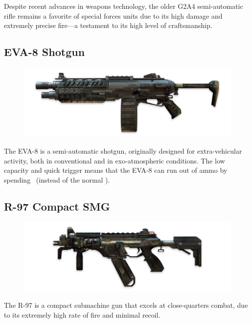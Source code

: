 \documentclass[9pt, openany]{extbook}
\begin{document}
Despite recent advances in weapons technology, the older G2A4 semi-automatic rifle remains a favorite of special forces units due to its high damage and extremely precise fire---a testament to its high level of craftsmanship.

\subsection{EVA-8 Shotgun}
\begin{figure}
\vspace*{-2em}
\includegraphics[width=\linewidth]{EVA8Shotgun}
\end{figure}


The EVA-8 is a semi-automatic shotgun, originally designed for extra-vehicular activity, both in conventional and in exo-atmospheric conditions. The low capacity and quick trigger means that the EVA-8 can run out of ammo by spending \Threat\Threat\Threat\ (instead of the normal \Despair).

\subsection{R-97 Compact SMG}
\begin{figure}
\vspace*{-2em}
\includegraphics[width=\linewidth]{R97CompactSMG}
\end{figure}

The R-97 is a compact submachine gun that excels at close-quarters combat, due to its extremely high rate of fire and minimal recoil.
\end{document}
